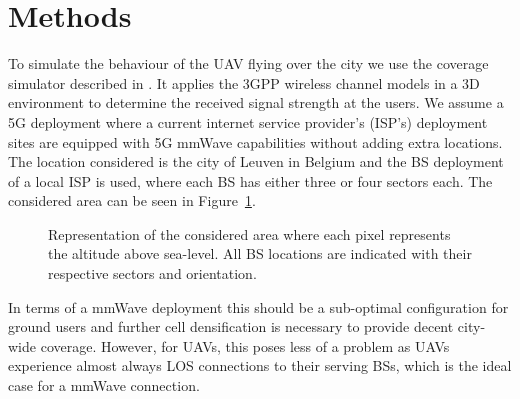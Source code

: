 \documentclass[conference,twocolumn]{IEEEtran}
\begin{document}
\section{Methods}
\par To simulate the behaviour of the UAV flying over the city we use the coverage simulator described in \cite{Colpaert2018}.
It applies the 3GPP wireless channel models \cite{3gpp.38.901} in a 3D environment to determine the received signal strength at the users. We assume a 5G deployment where a current internet service provider's (ISP's) deployment sites are equipped with 5G mmWave capabilities without adding extra locations. The location considered is the city of Leuven in Belgium and the BS deployment of a local ISP is used, where each BS has either three or four sectors each. The considered area can be seen in Figure~\ref{fig:area}. 
\begin{figure}[tbp]
\centering

\caption{Representation of the considered area where each pixel represents the altitude above sea-level. All BS locations are indicated with their respective sectors and orientation.}
\label{fig:area}
\end{figure}
In terms of a mmWave deployment this should be a sub-optimal configuration for ground users and further cell densification is necessary to provide decent city-wide coverage. However, for UAVs, this poses less of a problem as UAVs experience almost always LOS connections to their serving BSs, which is the ideal case for a mmWave connection.
\end{document}
